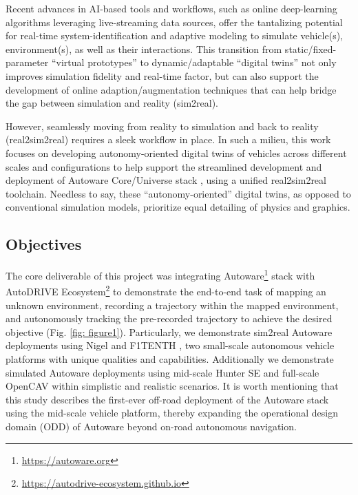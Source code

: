 Recent advances in AI-based tools and workflows, such as online deep-learning algorithms leveraging live-streaming data sources, offer the tantalizing potential for real-time system-identification and adaptive modeling to simulate vehicle(s), environment(s), as well as their interactions. This transition from static/fixed-parameter “virtual prototypes” to dynamic/adaptable “digital twins” not only improves simulation fidelity and real-time factor, but can also support the development of online adaption/augmentation techniques that can help bridge the gap between simulation and reality (sim2real).

However, seamlessly moving from reality to simulation and back to reality (real2sim2real) \cite{Real2Sim2Real} requires a sleek workflow in place. In such a milieu, this work focuses on developing autonomy-oriented digital twins of vehicles across different scales and configurations to help support the streamlined development and deployment of Autoware Core/Universe stack \cite{AutowareCore, AutowareUniverse, AutowareStack}, using a unified real2sim2real toolchain. Needless to say, these ``autonomy-oriented'' digital twins, as opposed to conventional simulation models, prioritize equal detailing of physics and graphics.

\hypertarget{Objectives}{%
\subsection{Objectives}\label{Objectives}}

The core deliverable of this project was integrating Autoware\footnote{\url{https://autoware.org}} \cite{Autoware} stack with AutoDRIVE Ecosystem\footnote{\url{https://autodrive-ecosystem.github.io}} \cite{AutoDRIVEEcosystem, AutoDRIVESimulator, AutoDRIVEReport, AutoDRIVESimulatorReport} to demonstrate the end-to-end task of mapping an unknown environment, recording a trajectory within the mapped environment, and autonomously tracking the pre-recorded trajectory to achieve the desired objective (Fig. \ref{fig: figure1}). Particularly, we demonstrate sim2real Autoware deployments using Nigel \cite{Nigel} and F1TENTH \cite{F1TENTH}, two small-scale autonomous vehicle platforms with unique qualities and capabilities. Additionally we demonstrate simulated Autoware deployments using mid-scale Hunter SE \cite{HunterSE} and full-scale OpenCAV \cite{OpenCAV} within simplistic and realistic scenarios. It is worth mentioning that this study describes the first-ever off-road deployment of the Autoware stack using the mid-scale vehicle platform, thereby expanding the operational design domain (ODD) of Autoware beyond on-road autonomous navigation.

